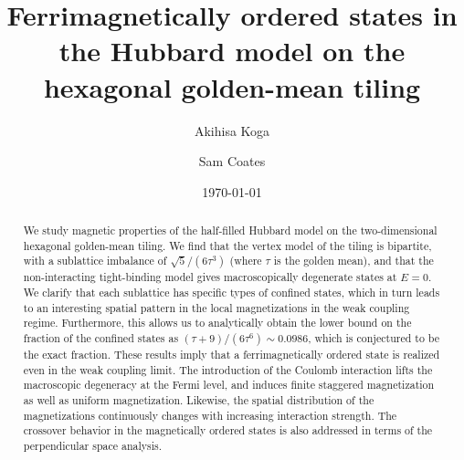 \documentclass[aps,twocolumn,pra,superscriptaddress,amsmath,amssymb]{revtex4-1}
\begin{document}
\let\emph\textit

\title{
  Ferrimagnetically ordered states in the Hubbard model
  on the hexagonal golden-mean tiling 
}

\author{Akihisa Koga}


\author{Sam Coates}


\date{\today}
\begin{abstract}
  We study magnetic properties of the half-filled Hubbard model on the two-dimensional hexagonal golden-mean tiling.
  We find that the vertex model of the tiling is bipartite,
  with a sublattice imbalance of $\sqrt{5}/(6\tau^3)$ (where $\tau$ is the golden mean),
  and that the non-interacting tight-binding model gives macroscopically degenerate states at $E=0$.
  We clarify that each sublattice has specific types of confined states,
  which in turn leads to an interesting spatial pattern in the local magnetizations in the weak coupling regime.
  Furthermore, this allows us to analytically obtain the lower bound on the fraction of the confined states
  as $(\tau+9)/(6\tau^6)\sim 0.0986$, which is conjectured to be the exact fraction.
  These results imply that a ferrimagnetically ordered state is realized even in the weak coupling limit.
  The introduction of the Coulomb interaction lifts the macroscopic degeneracy at the Fermi level,
  and induces finite staggered magnetization as well as uniform magnetization.
  Likewise, the spatial distribution of the magnetizations continuously changes with increasing interaction strength.
  The crossover behavior in the magnetically ordered states is also addressed
  in terms of the perpendicular space analysis.
\end{abstract}
\maketitle

\end{document}
